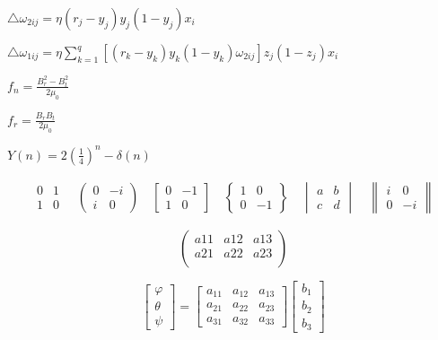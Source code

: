\documentclass[10pt,journal,compsoc]{IEEEtran}
\begin{document}
	$\triangle \omega_{2ij}=\eta{(r_j-y_j)y_j(1-y_j)x_i}$
	
	
	$\triangle \omega_{1ij}=\eta\sum_{k=1}^q{[(r_k-y_k)y_k(1-y_k)\omega_{2ij}]z_j(1-z_j)x_i}$
	
	
	
	$f_n=\frac {B_r^2-B_t^2}{2\mu_0}$
	
	$f_r=\frac{B_r B_t}{2\mu_0}$
	
	
	$Y(n)=2 (\frac{1}{4})^n-\delta(n)$




	$$
	\begin{gathered}
	\begin{matrix} 0 & 1 \\ 1 & 0 \end{matrix}
	\quad
	\begin{pmatrix} 0 & -i \\ i & 0 \end{pmatrix}
	\quad
	\begin{bmatrix} 0 & -1 \\ 1 & 0 \end{bmatrix}
	\quad
	\begin{Bmatrix} 1 & 0 \\ 0 & -1 \end{Bmatrix}
	\quad
	\begin{vmatrix} a & b \\ c & d \end{vmatrix}
	\quad
	\begin{Vmatrix} i & 0 \\ 0 & -i \end{Vmatrix}
	\end{gathered}
	$$

	\begin{equation}       %
	\left(                 %
	\begin{array}{ccc}   %
	a11 & a12 & a13\\  %
	a21 & a22 & a23\\  %
	\end{array}
	\right)                 %
	\end{equation}


	\begin{equation}
	\left[
	\begin{array}{c}
	\varphi \\
	\theta \\
	\psi
	\end{array}
	\right]
	=
	\left[
	\begin{array}{ccc}
	a_{11} & a_{12} & a_{13} \\
	a_{21} & a_{22} & a_{23} \\
	a_{31} & a_{32} & a_{33}
	\end{array}
	\right]
	\left[
	\begin{array}{c}
	b_{1} \\ 
	b_{2} \\
	b_{3}
	\end{array}
	\right]
	\end{equation}
\end{document}
